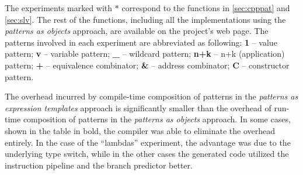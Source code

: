 %

The experiments marked with $*$ correspond to the functions in 
\textsection\ref{sec:cpppat} and \textsection\ref{sec:slv}. The rest of the 
functions, including all the implementations using the \emph{patterns as objects} 
approach, are available on the project's web page. The patterns involved in each 
experiment are abbreviated as following:
{\bf 1}   -- value pattern;
{\bf v}   -- variable pattern;
{\bf \_}  -- wildcard pattern;
{\bf n+k} -- n+k (application) pattern;
{\bf +}   -- equivalence combinator;
{\bf \&}  -- address combinator;
{\bf C}   -- constructor pattern.


The overhead incurred by compile-time composition of 
patterns in the \emph{patterns as expression templates} approach is significantly 
smaller than the overhead of run-time composition of patterns in the \emph{patterns 
as objects} approach. In some cases, shown in the table in bold, the compiler was 
able to eliminate the overhead entirely. In the case of the ``lambdas'' experiment, the 
advantage was due 
to the underlying type switch, while in the other cases the generated code
utilized the instruction pipeline and the branch predictor better.

